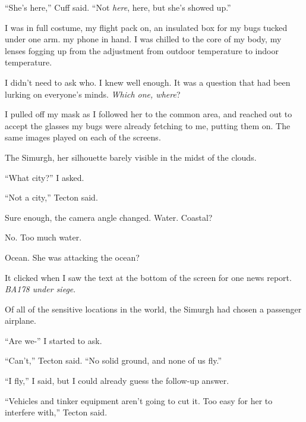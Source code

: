 ``She's here,'' Cuff said.  ``Not \emph{here}, here, but she's showed up.''



I was in full costume, my flight pack on, an insulated box for my bugs tucked under one arm. my phone in hand.  I was chilled to the core of my body, my lenses fogging up from the adjustment from outdoor temperature to indoor temperature.



I didn't need to ask who.  I knew well enough.  It was a question that had been lurking on everyone's minds.  \emph{Which one, where}?



I pulled off my mask as I followed her to the common area, and reached out to accept the glasses my bugs were already fetching to me, putting them on.  The same images played on each of the screens.



The Simurgh, her silhouette barely visible in the midst of the clouds.



``What city?'' I asked.



``Not a city,'' Tecton said.



Sure enough, the camera angle changed.  Water.  Coastal?



No.  Too much water.



Ocean.  She was attacking the ocean?



It clicked when I saw the text at the bottom of the screen for one news report.  \emph{BA178 under siege}.



Of all of the sensitive locations in the world, the Simurgh had chosen a passenger airplane.



``Are we-'' I started to ask.



``Can't,'' Tecton said.  ``No solid ground, and none of us fly.''



``I fly,'' I said, but I could already guess the follow-up answer.



``Vehicles and tinker equipment aren't going to cut it.  Too easy for her to interfere with,'' Tecton said.



